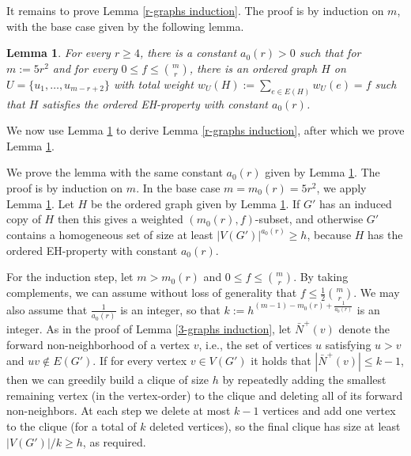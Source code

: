\documentclass[11pt]{article}
\let\oldendproof\endproof
\renewenvironment{proof}[1][\proofname]{%
	\oldproof[\bf #1]%
}{\oldendproof}
\theoremstyle{plain}
\newtheorem{lemma}[theorem]{Lemma}
\begin{document}
It remains to prove Lemma \ref{r-graphs induction}. The proof is by induction on $m$, with the base case given by the following lemma. 
\begin{lemma} \label{r-graphs induction base case}
    For every $r \geq 4$,  there is a constant $a_0(r)>0$ such that for $m := 5 r^2$ and for every $0 \leq f \leq \binom{m}{r}$, there is an ordered graph $H$ on $U=\{u_1,\dots,u_{m-r+2}\}$ with total weight $w_U(H) := \sum_{e \in E(H)} w_U(e) = f$ such that $H$ satisfies the ordered EH-property with constant $a_0(r)$.
\end{lemma}
\noindent
We now use Lemma \ref{r-graphs induction base case} to derive Lemma \ref{r-graphs induction}, after which we prove Lemma \ref{r-graphs induction base case}.

\begin{proof} [Proof of Lemma \ref{r-graphs induction}]
    We prove the lemma with the same constant $a_0(r)$ given by Lemma \ref{r-graphs induction base case}.
    The proof is by induction on $m$. In the base case $m=m_0(r) = 5r^2$, we apply Lemma \ref{r-graphs induction base case}. 
    Let $H$ be the ordered graph given by Lemma \ref{r-graphs induction base case}. If $G'$ has an induced copy of $H$ then this gives a weighted $(m_0(r),f)$-subset, and otherwise $G'$ 
    contains a homogeneous set of size at least $|V(G')|^{a_0(r)} \geq h$, because $H$ has the ordered EH-property with constant $a_0(r)$.
         
    For the induction step, let $m > m_0(r)$ and $0 \leq f \leq \binom{m}{r}$.
    By taking complements, we can assume without loss of generality that $f \leq \frac{1}{2}\binom{m}{r}$.
    We may also assume 
    that 
    $\frac{1}{a_0(r)}$ is an integer, so that $k := h^{(m-1) - m_0(r) + \frac{1}{a_0(r)}}$ is an integer. 
    As in the proof of Lemma \ref{3-graphs induction}, let $\bar{N}^+(v)$ denote the forward non-neighborhood of a vertex $v$, i.e., the set of vertices $u$ satisfying $u > v$ and $uv \notin E(G')$. 
    If for every vertex $v \in V(G')$ it holds that 
    $|\bar{N}^+(v)| \leq k-1$, then we can greedily build a clique of size $h$ by repeatedly adding the smallest remaining vertex (in the vertex-order) to the clique and deleting all of its forward non-neighbors. At each step we delete at most $k-1$ vertices and add one vertex to the clique (for a total of $k$ deleted vertices), so 
    the final clique has size at least $|V(G')|/k \geq h$, as required.
    

\end{proof}
\end{document}
